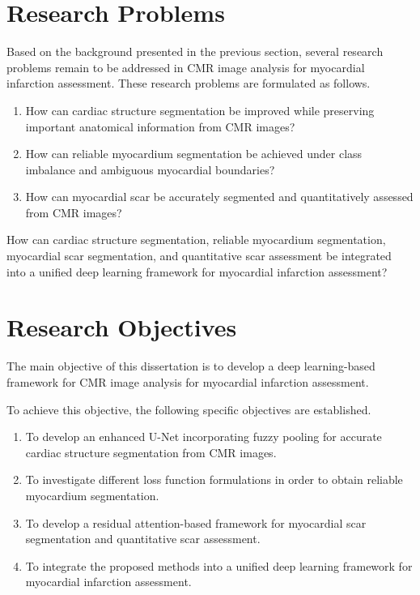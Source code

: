 \section{Research Problems}
\label{sec:research-problems}

Based on the background presented in the previous section, several
research problems remain to be addressed in CMR image analysis for
myocardial infarction assessment. These research problems are formulated
as follows.

\begin{enumerate}
	\def\labelenumi{\arabic{enumi}.}
	\item
	How can cardiac structure segmentation be improved while preserving
	important anatomical information from CMR images?
	\item
	How can reliable myocardium segmentation be achieved under class
	imbalance and ambiguous myocardial boundaries?
	\item
	How can myocardial scar be accurately segmented and quantitatively
	assessed from CMR images?
\end{enumerate}

How can cardiac structure segmentation, reliable myocardium
segmentation, myocardial scar segmentation, and quantitative scar
assessment be integrated into a unified deep learning framework for
myocardial infarction assessment?

\section{Research Objectives}
\label{sec:research-objectives}

The main objective of this dissertation is to develop a deep
learning-based framework for CMR image analysis for myocardial
infarction assessment.

To achieve this objective, the following specific objectives are
established.

\begin{enumerate}
	\def\labelenumi{\arabic{enumi}.}
	\item
	To develop an enhanced U-Net incorporating fuzzy pooling for accurate
	cardiac structure segmentation from CMR images.
	\item
	To investigate different loss function formulations in order to obtain
	reliable myocardium segmentation.
	\item
	To develop a residual attention-based framework for myocardial scar
	segmentation and quantitative scar assessment.
	\item
	To integrate the proposed methods into a unified deep learning
	framework for myocardial infarction assessment.
\end{enumerate}

